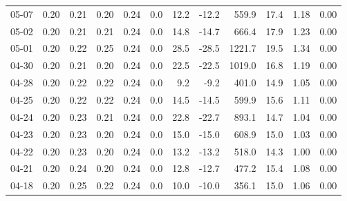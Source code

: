 \begin{threeparttable}
{\begin{tabular}{lrrrrrrrrrrr}
  05-07 &          0.20 &          0.21 &          0.20 &        0.24 &                 0.0 &                12.2 &      -12.2 &               559.9 &             17.4 &            1.18 &                   0.00 \\
  05-02 &          0.20 &          0.21 &          0.21 &        0.24 &                 0.0 &                14.8 &      -14.7 &               666.4 &             17.9 &            1.23 &                   0.00 \\
  05-01 &          0.20 &          0.22 &          0.25 &        0.24 &                 0.0 &                28.5 &      -28.5 &              1221.7 &             19.5 &            1.34 &                   0.00 \\
  04-30 &          0.20 &          0.21 &          0.20 &        0.24 &                 0.0 &                22.5 &      -22.5 &              1019.0 &             16.8 &            1.19 &                   0.00 \\
  04-28 &          0.20 &          0.22 &          0.22 &        0.24 &                 0.0 &                 9.2 &       -9.2 &               401.0 &             14.9 &            1.05 &                   0.00 \\
  04-25 &          0.20 &          0.22 &          0.22 &        0.24 &                 0.0 &                14.5 &      -14.5 &               599.9 &             15.6 &            1.11 &                   0.00 \\
  04-24 &          0.20 &          0.23 &          0.21 &        0.24 &                 0.0 &                22.8 &      -22.7 &               893.1 &             14.7 &            1.04 &                   0.00 \\
  04-23 &          0.20 &          0.23 &          0.20 &        0.24 &                 0.0 &                15.0 &      -15.0 &               608.9 &             15.0 &            1.03 &                   0.00 \\
  04-22 &          0.20 &          0.23 &          0.20 &        0.24 &                 0.0 &                13.2 &      -13.2 &               518.0 &             14.3 &            1.00 &                   0.00 \\
  04-21 &          0.20 &          0.24 &          0.20 &        0.24 &                 0.0 &                12.8 &      -12.7 &               477.2 &             15.4 &            1.08 &                   0.00 \\
  04-18 &          0.20 &          0.25 &          0.22 &        0.24 &                 0.0 &                10.0 &      -10.0 &               356.1 &             15.0 &            1.06 &                   0.00 \\

\end{tabular}}
\end{threeparttable}
